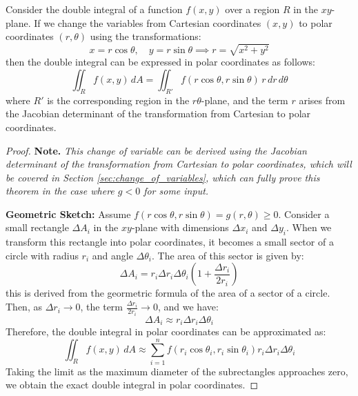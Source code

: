 \documentclass[11pt]{report}
\begin{document}
\begin{theorem}
    Consider the double integral of a function $f(x,y)$ over a region $R$ in the $xy$-plane. If we change the variables from Cartesian coordinates $(x,y)$ to polar coordinates $(r,\theta)$ using the transformations:
    $$
        x = r \cos{\theta}, \quad y = r \sin{\theta} \implies r = \sqrt{x^2 + y^2}
    $$
    then the double integral can be expressed in polar coordinates as follows:
    \begin{equation}
        \iint_R f(x,y) \, dA = \iint_{R'} f(r \cos{\theta}, r \sin{\theta}) \, r \, dr \, d\theta
    \end{equation}
    where $R'$ is the corresponding region in the $r\theta$-plane, and the term $r$ arises from the Jacobian determinant of the transformation from Cartesian to polar coordinates.
\end{theorem}
\begin{proof}
   \textbf{Note. } \textit{This change of variable can be derived using the Jacobian determinant of the transformation from Cartesian to polar coordinates, which will be covered in Section \ref{sec:change_of_variables}, which can fully prove this theorem in the case where $g < 0$ for some input.}

   \textbf{Geometric Sketch: } Assume $f(r \cos{\theta}, r \sin{\theta}) = g(r, \theta) \ge 0$. Consider a small rectangle $\Delta A_i$ in the $xy$-plane with dimensions $\Delta x_i$ and $\Delta y_i$. When we transform this rectangle into polar coordinates, it becomes a small sector of a circle with radius $r_i$ and angle $\Delta \theta_i$. The area of this sector is given by:
    $$
          \Delta A_i = r_i \Delta r_i \Delta \theta_i  \left( 1 + \frac{\Delta r_i}{2r_i} \right)
    $$
    this is derived from the geormetric formula of the area of a sector of a circle. Then, as $\Delta r_i \to 0$, the term $\frac{\Delta r_i}{2r_i} \to 0$, and we have:
    $$
        \Delta A_i \approx r_i \Delta r_i \Delta \theta_i
    $$
    Therefore, the double integral in polar coordinates can be approximated as:
    $$
        \iint_R f(x,y) \, dA \approx \sum_{i=1}^n f(r_i \cos{\theta_i}, r_i \sin{\theta_i}) r_i \Delta r_i \Delta \theta_i
    $$
    Taking the limit as the maximum diameter of the subrectangles approaches zero, we obtain the exact double integral in polar coordinates.
\end{proof}
\end{document}
